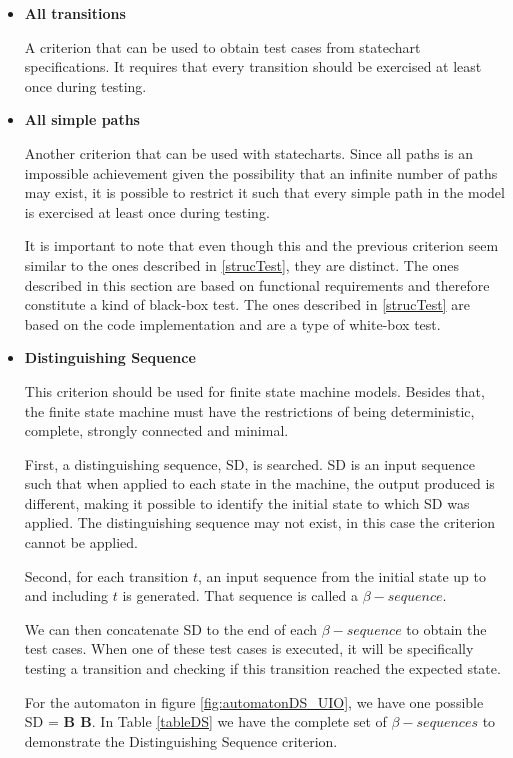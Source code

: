 \begin{itemize}

\item \textbf{All transitions}

A criterion that can be used to obtain test cases from statechart specifications. It requires that every transition should be exercised at least once during testing.

\item \textbf{All simple paths}

Another criterion that can be used with statecharts. Since all paths is an impossible achievement given the possibility that an infinite number of paths may exist, it is possible to restrict it such that every simple path in the model is exercised at least once during testing.

It is important to note that even though this and the previous criterion seem similar to the ones described in \ref{strucTest}, they are distinct. The ones described in this section are based on functional requirements and therefore constitute a kind of black-box test. The ones described in \ref{strucTest} are based on the code implementation and are a type of white-box test.

\item \textbf{Distinguishing Sequence}

This criterion should be used for finite state machine models. Besides that, the finite state machine must have the restrictions of being deterministic, complete, strongly connected and minimal. 

First, a distinguishing sequence, SD, is searched. SD is an input sequence such that when applied to each state in the machine, the output produced is different, making it possible to identify the initial state to which SD was applied. The distinguishing sequence may not exist, in this case the criterion cannot be applied.

Second, for each transition $t$, an input sequence from the initial state up to and including $t$ is generated. That sequence is called a $\beta-sequence$.

We can then concatenate SD to the end of each $\beta-sequence$ to obtain the test cases. When one of these test cases is executed, it will be specifically testing a transition and checking if this transition reached the expected state.

For the automaton in figure \ref{fig:automatonDS_UIO}, we have one possible SD = \textbf{B B}. In Table \ref{tableDS} we have the complete set of $\beta-sequences$ to demonstrate the Distinguishing Sequence criterion.


\end{itemize}
